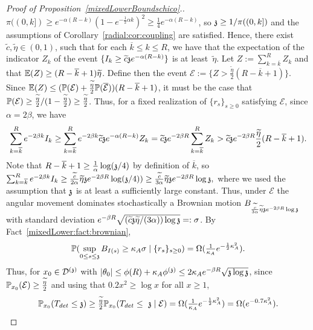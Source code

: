 \begin{proof}[Proof of Proposition~\ref{mixedLowerBoundschico}.]
$\pi((0,k])\ge e^{-\alpha(R-k)}(1-e^{-\frac12\alpha k})^2\ge \frac{1}{4}e^{-\alpha(R-k)}$, so $\ss\ge 1/\pi((0,k])$ and the assumptions of Corollary~\ref{radial:cor:coupling} are satisfied. Hence, there exist $\widetilde{c}, \widetilde{\eta} \in (0,1)$, such that for each $\overline{k} \le k \le R$, we have that the expectation of the indicator $Z_k$ of the event $\{I_k\geq \widetilde{c}\ss e^{-\alpha (R-k)}\}$ is at least~$\widetilde{\eta}$. Let $Z:=\sum_{k=\overline{k}}^R Z_k$ and that $\EE(Z) \ge (R-\overline{k}+1)\widetilde{\eta}$. Define then the event 
$\mathcal{E}:=\{Z>\frac{\widetilde{\eta}}{2}(R-\overline{k}+1)\}$. Since $\EE(Z)\le (\PP(\mathcal{E})+\frac{\widetilde{\eta}}{2}\PP(\overline{\mathcal{E}}))(R-\overline{k}+1)$,
it must be the case that $\PP(\mathcal{E})\ge\frac{\widetilde{\eta}}{2}/(1-\frac{\widetilde{\eta}}{2})\ge\frac{\widetilde{\eta}}{2}$.
Thus, for a fixed realization of $\{r_s\}_{s\geq 0}$ satisfying $\mathcal{E}$, since $\alpha=2\beta$, we have 
\[
\sum_{k=\overline{k}}^{R}e^{-2\beta k}I_k 
\geq\sum_{k=\overline{k}}^{R}e^{-2\beta k}\widetilde{c}\ss e^{-\alpha (R-k)}Z_k
= \widetilde{c}\ss e^{-2\beta R}\sum_{k=\overline{k}}^R Z_k 
> \widetilde{c}\ss e^{-2\beta R}\frac{\widetilde{\eta}}{2}(R-\overline{k}+1).
\]
Note that  $R-\overline{k}+1\ge \frac{1}{\alpha}\log (\ss/4)$ by definition of $\overline{k}$, so 
$
\sum_{k=\overline{k}}^R e^{-2\beta k}I_k\geq \frac{\widetilde{c}}{2\alpha}\widetilde{\eta}\ss e^{-2\beta R}\log(\ss/4)) \ge \frac{\widetilde{c}}{3\alpha}\widetilde{\eta}\ss e^{-2\beta R}\log\ss,
$
where we used the assumption that $\ss$ is at least a sufficiently large constant.
Thus, under $\mathcal{E}$ the angular movement dominates stochastically
a Brownian motion $B_{\frac{\widetilde{c}}{3\alpha}\widetilde{\eta}\ss e^{-2\beta R}\log\ss}$ with standard deviation 
$e^{-\beta R}\sqrt{(\widetilde{c}\ss \widetilde{\eta}/(3\alpha))\log\ss}=:\sigma$. By Fact~\ref{mixedLower:fact:brownian}, %
\[
\PP(\sup_{0\leq s\leq \ss} B_{\II{s}}\geq \KA \sigma \mid \{r_s\}_{s\geq 0})=\Omega(\tfrac{1}{\KA}e^{-\frac12\KA^2}).
\]
Thus, for $x_0 \in \dt$ with $|\theta_0| \le \phi(R)+\KA \phis\le 2\KA e^{-\beta R}\sqrt{\ss \log \ss}$, since $\P_{x_0}(\mathcal{E})\geq \frac{\widetilde{\eta}}{2}$ and using that $0.2x^2\ge \log x$ for all $x\ge 1$,
\begin{equation}\label{startstationary}
\P_{x_0}(T_{det}\le \ss)\geq \tfrac{\widetilde{\eta}}{2}\P_{x_0}(T_{det} \le \ss \mid \mathcal{E})=\Omega(\tfrac{1}{\KA}e^{-\frac12\KA^2})=\Omega(e^{-0.7\KA^2}).%
\end{equation}


\end{proof}
